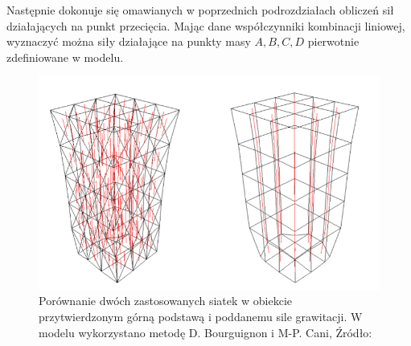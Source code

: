 Następnie dokonuje się omawianych w poprzednich podrozdziałach obliczeń sił
działających na punkt przecięcia. Mając dane współczynniki kombinacji liniowej,
	wyznaczyć można siły działające na punkty masy $A,B,C, D$ pierwotnie zdefiniowane w modelu. 

\begin{figure}[ht]
\centering
\includegraphics[scale=0.5]{images/fixed_anisotropy.png}
\caption{Porównanie dwóch zastosowanych siatek w obiekcie przytwierdzonym górną podstawą i poddanemu sile grawitacji. W modelu wykorzystano metodę D. Bourguignon i M-P. Cani, Źródło: \cite{ca}}
\label{anizotropia-czworoscian-fix}
\end{figure}

